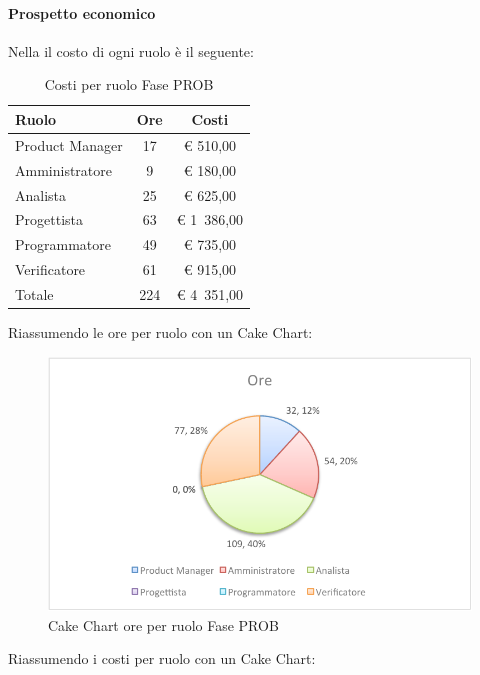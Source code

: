 			\paragraph{Prospetto economico}
				Nella  il costo di ogni ruolo è il seguente:
				\begin{table}[H]
					\begin{center}
						\begin{tabular}{| l | c | c |}
							\hline
							Ruolo 			& Ore 	& Costi  \\ \hline
							
							Product Manager	& 17 		& \euro{} 510,00 	\\
							Amministratore 		& 9 		& \euro{} 180,00 	\\
							Analista	 		& 25 		& \euro{} 625,00 	\\
							Progettista 		& 63 		& \euro{} 1~386,00  	\\
							Programmatore		& 49 		& \euro{} 735,00 	\\
							Verificatore		& 61 		& \euro{} 915,00 	\\ \hline \hline
							
							Totale	 		& 224 	& \euro{} 4~351,00 	\\ \hline
						\end{tabular}
					\end{center}
					\caption{Costi per ruolo Fase PROB}
				\end{table}
				Riassumendo le ore per ruolo con un Cake Chart:
				\begin{figure}[H]\centering
					\includegraphics[width=\textwidth]{PianoDiProgetto/Pics/ChartTotOreFasePROB.pdf}
					\caption{Cake Chart ore per ruolo Fase PROB}
				\end{figure}
				Riassumendo i costi per ruolo con un Cake Chart:
